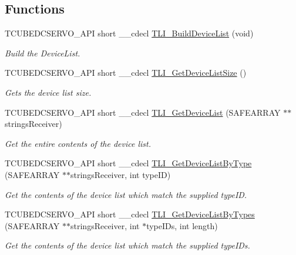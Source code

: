 \subsection*{Functions}
\begin{DoxyCompactItemize}
\item 
T\+C\+U\+B\+E\+D\+C\+S\+E\+R\+V\+O\+\_\+\+A\+PI short \+\_\+\+\_\+cdecl \hyperlink{group___t_cube_d_c_servo_gad7103bd9c57c156b646c981187104b18}{T\+L\+I\+\_\+\+Build\+Device\+List} (void)
\begin{DoxyCompactList}\small\item\em Build the Device\+List. \end{DoxyCompactList}\item 
T\+C\+U\+B\+E\+D\+C\+S\+E\+R\+V\+O\+\_\+\+A\+PI short \+\_\+\+\_\+cdecl \hyperlink{group___t_cube_d_c_servo_ga7e949af0e5a2a17f3669211b3c5fc6f1}{T\+L\+I\+\_\+\+Get\+Device\+List\+Size} ()
\begin{DoxyCompactList}\small\item\em Gets the device list size. \end{DoxyCompactList}\item 
T\+C\+U\+B\+E\+D\+C\+S\+E\+R\+V\+O\+\_\+\+A\+PI short \+\_\+\+\_\+cdecl \hyperlink{group___t_cube_d_c_servo_ga729b4dc2d2c48a55d6a6040485bb4beb}{T\+L\+I\+\_\+\+Get\+Device\+List} (S\+A\+F\+E\+A\+R\+R\+AY $\ast$$\ast$strings\+Receiver)
\begin{DoxyCompactList}\small\item\em Get the entire contents of the device list. \end{DoxyCompactList}\item 
T\+C\+U\+B\+E\+D\+C\+S\+E\+R\+V\+O\+\_\+\+A\+PI short \+\_\+\+\_\+cdecl \hyperlink{group___t_cube_d_c_servo_gad0594c94d657df75786f55bf75503583}{T\+L\+I\+\_\+\+Get\+Device\+List\+By\+Type} (S\+A\+F\+E\+A\+R\+R\+AY $\ast$$\ast$strings\+Receiver, int type\+ID)
\begin{DoxyCompactList}\small\item\em Get the contents of the device list which match the supplied type\+ID. \end{DoxyCompactList}\item 
T\+C\+U\+B\+E\+D\+C\+S\+E\+R\+V\+O\+\_\+\+A\+PI short \+\_\+\+\_\+cdecl \hyperlink{group___t_cube_d_c_servo_ga89178ab96a07ff480f5fb5ca51d4ca9c}{T\+L\+I\+\_\+\+Get\+Device\+List\+By\+Types} (S\+A\+F\+E\+A\+R\+R\+AY $\ast$$\ast$strings\+Receiver, int $\ast$type\+I\+Ds, int length)
\begin{DoxyCompactList}\small\item\em Get the contents of the device list which match the supplied type\+I\+Ds. \end{DoxyCompactList}\item 
$$
\end{DoxyCompactItemize}

